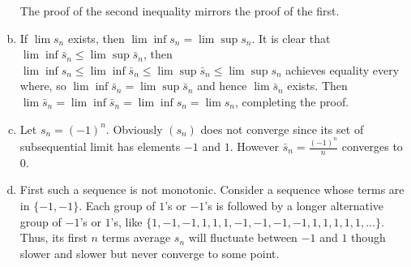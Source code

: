 \documentclass[12pt,lettersize]{article}
\begin{document}
\begin{enumerate}[(a)]
		The proof of the second inequality mirrors the proof of the first.
		\item If $\lim s_n$ exists, then $\lim\inf s_n=\lim\sup s_n$. It is clear that $\lim\inf\bar{s}_n\leq\lim\sup\bar{s}_n$, then $\lim\inf s_n\leq\lim\inf\bar{s}_n\leq\lim\sup\bar{s}_n\leq\lim\sup s_n$ achieves equality every where, so $\lim\inf\bar{s}_n=\lim\sup\bar{s}_n$ and hence $\lim\bar{s}_n$ exists. Then $\lim\bar{s}_n=\lim\inf\bar{s}_n=\lim\inf s_n=\lim s_n$, completing the proof.
		\item Let $s_n=(-1)^n$. Obviously $(s_n)$ does not converge since its set of subsequential limit has elements $-1$ and $1$. However $\bar{s}_n=\frac{(-1)^n}{n}$ converges to $0$.
		\item First such a sequence is not monotonic. Consider a sequence whose terms are in $\{-1, -1\}$. Each group of $1$'s or $-1$'s is followed by a longer alternative group of $-1$'s or $1$'s, like $\{1,-1,-1,1,1,1,-1,-1,-1,-1,1,1,1,1,1,\dots\}$. Thus, its first $n$ terms average $s_n$ will fluctuate between $-1$ and $1$ though slower and slower but never converge to some point. 
	\end{enumerate}
	\newpage
	
\end{document}
